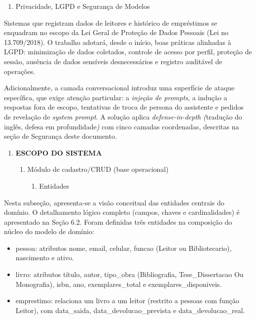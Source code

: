 \documentclass[
]{article}
\begin{document}
\begin{enumerate}
\def\labelenumi{\arabic{enumi}.}
\setcounter{enumi}{4}
\item
  \protect{}\label{_Toc230227814}{}Privacidade, LGPD e
  Segurança de Modelos
\end{enumerate}

Sistemas que registram dados de leitores e histórico de empréstimos se
enquadram no escopo da Lei Geral de Proteção de Dados Pessoais (Lei no
13.709/2018). O trabalho adotará, desde o início, boas práticas
alinhadas à LGPD: minimização de dados coletados, controle de acesso por
perfil, proteção de sessão, ausência de dados sensíveis desnecessários e
registro auditável de operações.

Adicionalmente, a camada conversacional introduz uma superfície de
ataque específica, que exige atenção particular: a \emph{injeção de
prompts}, a indução a respostas fora de escopo, tentativas de troca de
persona do assistente e pedidos de revelação de \emph{system prompt}. A
solução aplica \emph{defense-in-depth (}tradução do inglês, defesa em
profundidade\emph{)} com cinco camadas coordenadas, descritas na seção
de Segurança deste documento.

\begin{enumerate}
\def\labelenumi{\arabic{enumi}.}
\setcounter{enumi}{4}
\item
  \protect{}\label{_Toc230227815}{}\textbf{ESCOPO DO
  SISTEMA}

  \begin{enumerate}
  \def\labelenumii{\arabic{enumii}.}
  \item
    \protect{}\label{_Toc230227816}{}Módulo de
    cadastro/CRUD (base operacional)

    \begin{enumerate}
    \def\labelenumiii{\arabic{enumiii}.}
    \item
      \protect{}\label{_Toc230227817}{}Entidades
    \end{enumerate}
  \end{enumerate}
\end{enumerate}

Nesta subseção, apresenta-se a visão conceitual das entidades centrais
do domínio. O detalhamento lógico completo (campos, chaves e
cardinalidades) é apresentado na Seção 6.2. Foram definidas três
entidades na composição do núcleo do modelo de domínio:

\begin{itemize}
\item
  pessoa: atributos nome, email, celular, funcao (Leitor ou
  Bibliotecario), nascimento e ativo.
\item
  livro: atributos título, autor, tipo\_obra (Bibliografia,
  Tese\_Dissertacao Ou Monografia), isbn, ano, exemplares\_total e
  exemplares\_disponiveis.
\item
  emprestimo: relaciona um livro a um leitor (restrito a pessoas com
  função Leitor), com data\_saida, data\_devolucao\_prevista e
  data\_devolucao\_real.
\end{itemize}
\end{document}
